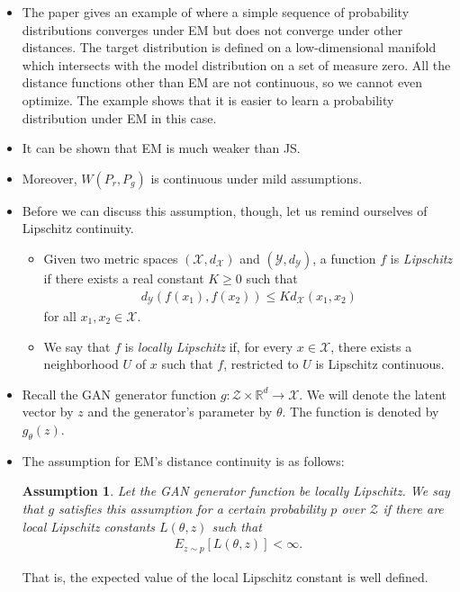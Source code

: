 \documentclass[10pt]{article}
\newtheorem{assumption}[lemma]{Assumption}
\begin{document}
\begin{itemize}
  	\item The paper gives an example of where a simple sequence of probability distributions converges under EM but does not converge under other distances. The target distribution is defined on a low-dimensional manifold which intersects with the model distribution on a set of measure zero. All the distance functions other than EM are not continuous, so we cannot even optimize. The example shows that it is easier to learn a probability distribution under EM in this case.

  	\item It can be shown that EM is much weaker than JS.

  	\item Moreover, $W(P_r, P_g)$ is continuous under mild assumptions.

  	\item Before we can discuss this assumption, though, let us remind ourselves of Lipschitz continuity.

  	\begin{itemize}
  		\item Given two metric spaces $(\mathcal{X}, d_{\mathcal{X}})$ and $(\mathcal{Y}, d_{\mathcal{Y}})$, a function $f$ is \emph{Lipschitz} if there exists a real constant $K \geq 0$ such that
	  	\begin{align*}
	  		d_{\mathcal{Y}}(f(x_1), f(x_2)) \leq K d_{\mathcal{X}}(x_1, x_2)
	  	\end{align*}
	  	for all $x_1, x_2 \in \mathcal{X}$.

	  	\item We say that $f$ is \emph{locally Lipschitz} if, for every $x \in \mathcal{X}$, there exists a neighborhood $U$ of $x$ such that $f$, restricted to $U$ is Lipschitz continuous.
  	\end{itemize}

  	\item Recall the GAN generator function $g: \mathcal{Z} \times \mathbb{R}^d \rightarrow \mathcal{X}$. We will denote the latent vector by $z$ and the generator's parameter by $\theta$. The function is denoted by $g_\theta(z)$.

  	\item The assumption for EM's distance continuity is as follows:
  	\begin{assumption} \label{assumption-1}
  		Let the GAN generator function be locally Lipschitz. We say that $g$ satisfies this assumption for a certain probability $p$ over $\mathcal{Z}$ if there are local Lipschitz constants $L(\theta,z)$ such that
  		\begin{align*}
  			E_{z \sim p}[L(\theta,z)] < \infty.
  		\end{align*}
  	\end{assumption}
  	That is, the expected value of the local Lipschitz constant is well defined.
  	

\end{itemize}
\end{document}
